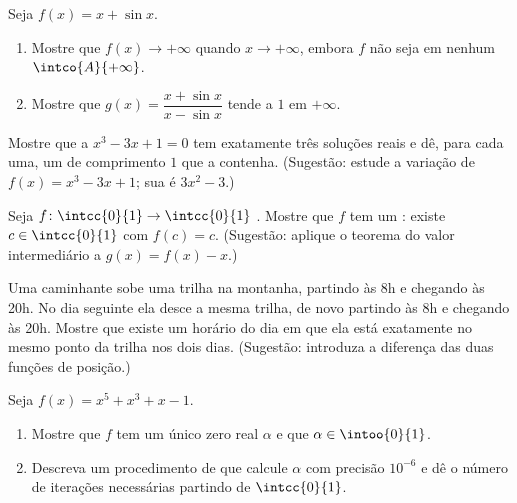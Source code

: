 \begin{exercise}[$\star\star$]\label{exo:g12:limcont:5}
Seja $f(x) = x + \sin x$.
\begin{enumerate}
  \item Mostre que $f(x) \to +\infty$ quando $x \to +\infty$, embora $f$
        não seja  em nenhum  $\intco{A}{+\infty}$.
  \item Mostre que $g(x) = \dfrac{x + \sin x}{x - \sin x}$ tende a $1$ em
        $+\infty$.
\end{enumerate}
\end{exercise}

\begin{exercise}[$\star\star$]\label{exo:g12:limcont:6}
Mostre que a  $x^3 - 3x + 1 = 0$ tem exatamente três soluções
reais e dê, para cada uma, um  de comprimento $1$ que a contenha.
(Sugestão: estude a variação de $f(x) = x^3 - 3x + 1$; sua  é
$3x^2 - 3$.)
\end{exercise}

\begin{exercise}[$\star\star$]\label{exo:g12:limcont:7}
Seja $f \colon \intcc{0}{1} \to \intcc{0}{1}$ . Mostre que $f$ tem
um \emph{}: existe $c \in \intcc{0}{1}$ com $f(c) = c$.
(Sugestão: aplique o teorema do valor intermediário a $g(x) = f(x) - x$.)
\end{exercise}

\begin{exercise}[$\star\star\star$]\label{exo:g12:limcont:8}
Uma caminhante sobe uma trilha na montanha, partindo às 8h e chegando às
20h. No dia seguinte ela desce a mesma trilha, de novo partindo às 8h e
chegando às 20h. Mostre que existe um horário do dia em que ela está
exatamente no mesmo ponto da trilha nos dois dias. (Sugestão: introduza a
diferença das duas funções de posição.)
\end{exercise}

\begin{exercise}[$\star\star\star$]\label{exo:g12:limcont:9}
Seja $f(x) = x^5 + x^3 + x - 1$.
\begin{enumerate}
  \item Mostre que $f$ tem um único zero real $\alpha$ e que
        $\alpha \in \intoo{0}{1}$.
  \item Descreva um procedimento de  que calcule $\alpha$ com
        precisão $10^{-6}$ e dê o número de iterações necessárias partindo
        de $\intcc{0}{1}$.
\end{enumerate}
\end{exercise}

